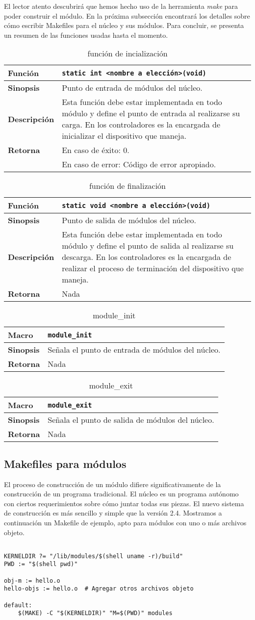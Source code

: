 \documentclass[12pt,a4paper,spanish]{article}
\newenvironment{funcdesc}[1]
	{	
		\begin{table}[!htp]
		\caption{ {#1} }
		\begin{small}
		\begin{tabular}{ | l | p{10cm} | } \hline
	}
	{
		\end{tabular}
		\end{small}
		\end{table}
	}
\newcommand{\funcion}[1] {\textbf {Función} &  \texttt{{#1}} \\ \hline}
\newcommand{\unamacro}[1] {\textbf {Macro} &  \texttt{{#1}} \\ \hline}
\newcommand{\sinopsis}[1] {\textbf {Sinopsis} &  {#1} \\ \hline}
\newcommand{\descrip}[1] {\textbf {Descripción} &  {#1} \\ \hline}
\newcommand{\return}[2]{ \textbf{Retorna} & En caso de éxito: {#1} \\ & En caso de error: {#2} \\ \hline }
\newcommand{\returnNada}[0]{ \textbf{Retorna} & Nada \\ \hline }
\begin{document}
El lector atento descubrirá que hemos hecho uso de la herramienta \textit{make} para poder construir el módulo. En la próxima subsección encontrará los detalles sobre cómo escribir Makefiles para el núcleo y sus módulos. Para concluir, se presenta un resumen de las funciones usadas hasta el momento. 

\begin{funcdesc}{función de incialización}
\funcion {static int <nombre a elección>(void)}
\sinopsis{Punto de entrada de módulos del núcleo.}
\descrip{Esta función debe estar implementada en todo módulo y define el punto de entrada al realizarse su carga. En los controladores es la encargada de inicializar el dispositivo que maneja.}
\return{0.}{Código de error apropiado.}
\end{funcdesc}

\begin{funcdesc}{función de finalización}
\funcion{static void <nombre a elección>(void)}
\sinopsis{Punto de salida de módulos del núcleo.}
\descrip{Esta función debe estar implementada en todo módulo y define el punto de salida al realizarse su descarga. En los controladores es la encargada de realizar el proceso de terminación del dispositivo que maneja.}
\returnNada
\end{funcdesc}

\begin{funcdesc}{module\_init}
\unamacro{module\_init}
\sinopsis{Señala el punto de entrada de módulos del núcleo.}
\returnNada
\end{funcdesc}

\begin{funcdesc}{module\_exit}
\unamacro{module\_exit}
\sinopsis{Señala el punto de salida de módulos del núcleo.}
\returnNada
\end{funcdesc}

\subsection{Makefiles para módulos}

El proceso de construcción de un módulo difiere significativamente de la construcción de un programa tradicional. El núcleo es un programa autónomo con ciertos requerimientos sobre cómo juntar todas sus piezas. El nuevo sistema de construcción es más sencillo y simple que la versión 2.4. Mostramos a continuación un Makefile de ejemplo, apto para módulos con uno o más archivos objeto.

\begin{small}
\begin{verbatim}

KERNELDIR ?= "/lib/modules/$(shell uname -r)/build"
PWD := "$(shell pwd)"

obj-m := hello.o
hello-objs := hello.o  # Agregar otros archivos objeto

default:
	$(MAKE) -C "$(KERNELDIR)" "M=$(PWD)" modules

\end{verbatim}
\end{small}
\end{document}
